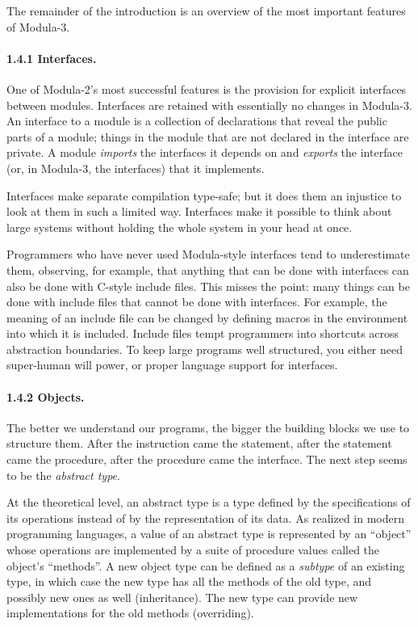 \documentclass[10pt]{article}
\begin{document}
The remainder of the introduction is an overview of the most important
features of Modula-3.

\paragraph{1.4.1 Interfaces.}

One of Modula-2's most successful features is the provision for explicit
interfaces between modules.  Interfaces are retained with essentially no
changes in Modula-3.  An interface to a module is a collection of declarations
that reveal the public parts of a module; things in the module that are not
declared in the interface are private.  A module \emph{imports} the interfaces
it depends on and \emph{exports} the interface (or, in Modula-3, the
interfaces) that it implements.

Interfaces make separate compilation type-safe; but it does them an injustice
to look at them in such a limited way.  Interfaces make it possible to think
about large systems without holding the whole system in your head at once.

Programmers who have never used Modula-style interfaces tend to underestimate
them, observing, for example, that anything that can be done with interfaces
can also be done with C-style include files.  This misses the point: many
things can be done with include files that cannot be done with interfaces.
For example, the meaning of an include file can be changed by defining macros
in the environment into which it is included.  Include files tempt programmers
into shortcuts across abstraction boundaries.  To keep large programs well
structured, you either need super-human will power, or proper language support
for interfaces.

\paragraph{1.4.2 Objects.}

The better we understand our programs, the bigger the building blocks we use
to structure them.  After the instruction came the statement, after the
statement came the procedure, after the procedure came the interface.  The
next step seems to be the \emph{abstract type}.

At the theoretical level, an abstract type is a type defined by the
specifications of its operations instead of by the representation of its data.
As realized in modern programming languages, a value of an abstract type is
represented by an ``object'' whose operations are implemented by a suite of
procedure values called the object's ``methods''.  A new object type can be
defined as a \emph{subtype} of an existing type, in which case the new type
has all the methods of the old type, and possibly new ones as well
(inheritance).  The new type can provide new implementations for the old
methods (overriding).
\end{document}
